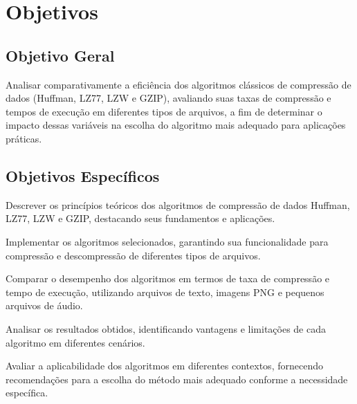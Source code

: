 \chapter{Objetivos}
\label{c.objetivos}

\section{Objetivo Geral}

Analisar comparativamente a eficiência dos algoritmos clássicos de compressão de dados (Huffman, LZ77, LZW e GZIP), avaliando suas taxas de compressão e tempos de execução em diferentes tipos de arquivos, a fim de determinar o impacto dessas variáveis na escolha do algoritmo mais adequado para aplicações práticas.

\section{Objetivos Específicos}

\begin{alineas}
	\item Descrever os princípios teóricos dos algoritmos de compressão de dados Huffman, LZ77, LZW e GZIP, destacando seus fundamentos e aplicações.
	\item Implementar os algoritmos selecionados, garantindo sua funcionalidade para compressão e descompressão de diferentes tipos de arquivos.
	\item Comparar o desempenho dos algoritmos em termos de taxa de compressão e tempo de execução, utilizando arquivos de texto, imagens PNG e pequenos arquivos de áudio.
	\item Analisar os resultados obtidos, identificando vantagens e limitações de cada algoritmo em diferentes cenários.
	\item Avaliar a aplicabilidade dos algoritmos em diferentes contextos, fornecendo recomendações para a escolha do método mais adequado conforme a necessidade específica.
\end{alineas}
